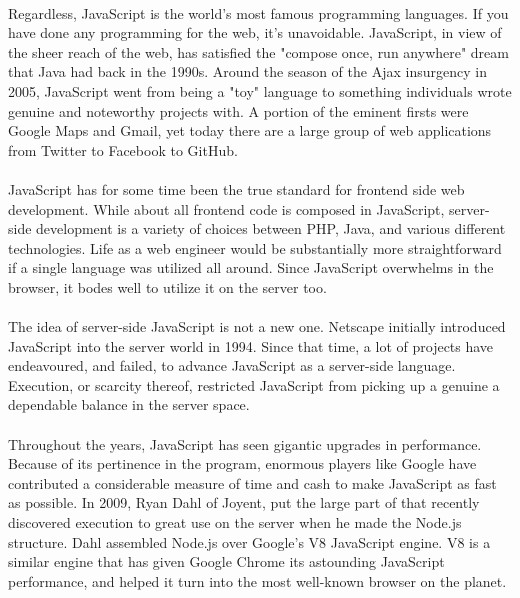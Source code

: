 \documentclass[a4paper, onecolumn, oneside, 11pt, wide, floatssmall]{mwrep}
\begin{document}
\paragraph{}
Regardless, JavaScript is the world's most famous programming languages. If you have done any programming for the web, it's unavoidable. JavaScript, in view of the sheer reach of the web, has satisfied the "compose once, run anywhere" dream that Java had back in the 1990s.  
Around the season of the Ajax insurgency in 2005, JavaScript went from being a "toy" language to something individuals wrote genuine and noteworthy projects with. A portion of the eminent firsts were Google Maps and Gmail, yet today there are a large group of web applications from Twitter to Facebook to GitHub.
\paragraph{}

JavaScript has for some time been the true standard for frontend side web development. While about all frontend code is composed in JavaScript, server-side development is a variety of choices between PHP, Java, and various different technologies. Life as a web engineer would be substantially more straightforward if a single language was utilized all around. Since JavaScript overwhelms in the browser, it bodes well to utilize it on the server too. 
\paragraph{}

The idea of server-side JavaScript is not a new one. Netscape initially introduced JavaScript into the server world in 1994. Since that time, a lot of projects have endeavoured, and failed, to advance JavaScript as a server-side language. Execution, or scarcity thereof, restricted JavaScript from picking up a genuine a dependable balance in the server space. 
\paragraph{}

Throughout the years, JavaScript has seen gigantic upgrades in performance. Because of its pertinence in the program, enormous players like Google have contributed a considerable measure of time and cash to make JavaScript as fast as possible. In 2009, Ryan Dahl of Joyent, put the large part of that recently discovered execution to great use on the server when he made the Node.js structure. Dahl assembled Node.js over Google's V8 JavaScript engine. V8 is a similar engine that has given Google Chrome its astounding JavaScript performance, and helped it turn into the most well-known browser on the planet.
\newpage
\end{document}
